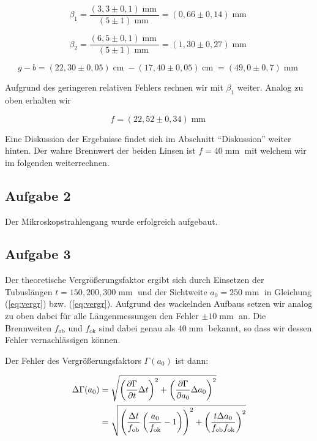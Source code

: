 \documentclass[a4paper,german,12pt,smallheadings]{scrartcl}
\begin{document}
\begin{equation}
  \beta_1 = \frac{(3{,}3 \pm 0{,}1) \operatorname{mm}}{(5\pm1) \operatorname{mm}} = (0{,}66\pm0{,}14) \operatorname{mm}
\end{equation}

\begin{equation}
  \beta_2 = \frac{(6{,}5 \pm 0{,}1) \operatorname{mm}}{(5\pm1) \operatorname{mm}} = (1{,}30\pm0{,}27) \operatorname{mm}
\end{equation}

\begin{equation}
  g -b = (22{,}30\pm0{,}05) \operatorname{cm} -
         (17{,}40 \pm 0{,}05) \operatorname{cm}
         = (49{,}0\pm0{,}7) \operatorname{mm}
\end{equation}

Aufgrund des geringeren relativen Fehlers rechnen wir mit $\beta_1$ weiter.
Analog zu oben erhalten wir

\begin{equation}
  f = (22{,}52 \pm 0{,}34) \operatorname{mm}
\end{equation}

Eine Diskussion der Ergebnisse findet sich im Abschnitt ``Diskussion'' weiter
hinten. Der wahre Brennwert der beiden Linsen ist $f = 40 \operatorname{mm}$
mit welchem wir im folgenden weiterrechnen.

\subsection{Aufgabe 2}

Der Mikroskopstrahlengang wurde erfolgreich aufgebaut.

\subsection{Aufgabe 3}
Der theoretische Vergrößerungsfaktor ergibt sich durch Einsetzen der
Tubuslängen $t = {150, 200, 300} \operatorname{mm}$ und der Sichtweite $a_0 =
250 \operatorname{mm}$ in Gleichung (\ref{eq:vergr}) bzw. (\ref{eq:vergr}).
Aufgrund des wackelnden Aufbaus setzen wir analog zu oben dabei für alle
Längenmessungen den Fehler $\pm 10 \operatorname{mm}$ an. Die Brennweiten
$f_\text{ob}$ und $f_\text{ok}$ sind dabei genau als $40 \operatorname{mm}$
bekannt, so dass wir dessen Fehler vernachlässigen können.

Der Fehler des Vergrößerungsfaktors $\Gamma(a_0)$ ist dann:

\begin{align*}
  \Delta \Gamma(a_0) &= \sqrt{
    \del{\frac{\partial \Gamma}{\partial t} \Delta t}^2 +
    \del{\frac{\partial \Gamma}{\partial a_0} \Delta a_0}^2
  } \\
  &= \sqrt{
    \del{
      \frac{\Delta t}{f_\text{ob}} \del{
        \frac{a_0}{f_\text{ok}} - 1
      }
    }^2 +
    \del{
      \frac{t \Delta a_0}{f_\text{ob} f_\text{ok}}
    }^2
  }
\end{align*}
\end{document}
